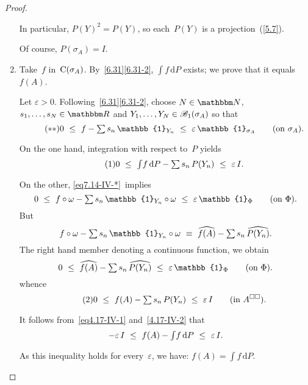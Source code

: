 \documentclass[main.tex]{subfiles}
\begin{document}
\begin{proof}
\begin{enumerate}[label=(\Roman*)]
In particular,
$P(Y)^2=P(Y)$,
so each~$P(Y)$ is a projection~(\ref{5.7}).

Of course, $P(\sigma_A)=I$.
%
\item\label{7.14-IV}
Take~$f$ in~$\mathrm{C}(\sigma_{A})$.
By~\ref{6.31}\ref{6.31-2},
$\int f\,\mathrm{d}P$ exists;
we prove that it equals~$f(A)$.

Let $\varepsilon>0$.
Following~\ref{6.31}\ref{6.31-2},
choose $N\in\N$,
$s_1,\dotsc,s_N\in\R$
and $Y_1,\dotsc,Y_N\in\mathscr{B}_1(\sigma_{A})$ so that
\begin{equation}
\label{eq7.14-IV-*}\tag{$**$}
0\ \leq\ f-{\textstyle\sum}\,s_n\,\mathbb{1}_{Y_n}
\ \leq\ \varepsilon\,\mathbb{1}_{\Sp{A}}\qquad(\htam{on }\Sp{A})\htam{.}
\end{equation}

On the one hand,
integration with respect to~$P$ yields
\begin{equation}
\label{eq7.14-IV-1}\tag{$1$}
0\ \leq\ {\textstyle\int}f\,\mathrm{d}P - 
{\textstyle\sum}\,s_n\,P(Y_n)\ \leq\ \varepsilon\,I\text{.}
\end{equation}

On the other,
\eqref{eq7.14-IV-*}~implies
\begin{equation*}
0\ \leq\ f\circ\omega -{\textstyle\sum}\,s_n\,\mathbb{1}_{Y_n}\circ\omega
\ \leq\ \varepsilon\,\mathbb{1}_\Phi\qquad(\htam{on }\Phi)\htam{.}
\end{equation*}
But
\begin{equation*}
f\circ\omega - {\textstyle\sum}\,s_n\,\mathbb{1}_{Y_n}\circ\omega
\ \equiv\ \widehat{f(A)} - {\textstyle\sum}\,s_n\,\widehat{P(Y_n)}\htam{.}
\end{equation*}
The right hand member denoting a continuous function,
we obtain
\begin{equation*}
0\ \leq\ \widehat{f(A)} - {\textstyle\sum}\,s_n\,\widehat{P(Y_n)}
\ \leq\ \varepsilon\,\mathbb{1}_\Phi\qquad(\htam{on }\Phi)\htam{.}
\end{equation*}
whence
\begin{equation}
\label{eq7.14-IV-2}\tag{$2$}
0\ \leq\ f(A)-{\textstyle\sum}\,s_n\,P(Y_n)\ \leq\ \varepsilon\,I
\qquad(\text{in }A^{\square\square})\text{.}
\end{equation}

It follows from~\eqref{eq4.17-IV-1} and~\eqref{4.17-IV-2} that
\begin{equation*}
-\varepsilon\,I\ \leq\ f(A)-{\textstyle\int}f\,\mathrm{d}P
\ \leq\ \varepsilon\,I\htam{.}
\end{equation*}

As this inequality holds for every~$\varepsilon$,
we have: $f(A)=\int f\,\mathrm{d}P$. \xqed
\end{enumerate}
\end{proof}
\end{document}
